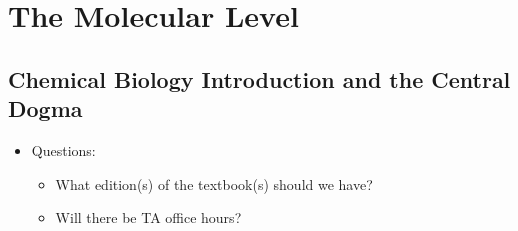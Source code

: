 \documentclass[../notes.tex]{subfiles}
\begin{document}
\chapter{The Molecular Level}
\section{Chemical Biology Introduction and the Central Dogma}
\begin{itemize}
    \item {}Questions:
    \begin{itemize}
        \item What edition(s) of the textbook(s) should we have?
        \item Will there be TA office hours?
    \end{itemize}
\end{itemize}
\end{document}
